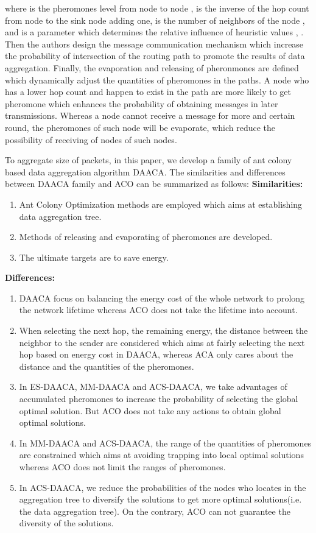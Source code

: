 \documentclass{elsarticle}
\begin{document}
where  is the pheromones level from node  to node ,  is the inverse of the hop count from node  to the sink node adding one,  is the number of neighbors of the node , and  is a parameter which determines the relative influence of heuristic values , .
Then the authors design the message communication mechanism which increase the probability of intersection of the routing path to promote the results of data aggregation.
Finally, the evaporation and releasing of pheronmones are defined which dynamically adjust the quantities of pheromones in the paths. A node who has a lower hop count and happen to exist in the path are more likely to get pheromone which enhances the probability of obtaining messages in later transmissions. Whereas a node cannot receive a message for more and certain round, the pheromones of such node will be evaporate, which reduce the possibility of receiving of nodes of such nodes.

To aggregate size of packets, in this paper, we develop a family of ant colony based data aggregation algorithm DAACA. The similarities and differences between DAACA family and ACO can be summarized as follows:
\textbf{Similarities:}
\begin{enumerate}
\item Ant Colony Optimization methods are employed which aims at establishing data aggregation tree.
\item Methods of releasing and evaporating of pheromones are developed.
\item The ultimate targets are to save energy.
\end{enumerate}
\textbf{Differences:}
\begin{enumerate}
\item DAACA focus on balancing the energy cost of the whole network to prolong the network lifetime whereas ACO does not take the lifetime into account.
\item When selecting the next hop, the remaining energy, the distance between the neighbor to the sender are considered which aims at fairly selecting the next hop based on energy cost in DAACA, whereas ACA only cares about the distance and the quantities of the pheromones.
\item In ES-DAACA, MM-DAACA and ACS-DAACA, we take advantages of accumulated pheromones to increase the probability of selecting the global optimal solution. But ACO does not take any actions to obtain global optimal solutions.
\item In MM-DAACA and ACS-DAACA, the range of the quantities of pheromones are constrained which aims at avoiding trapping into local optimal solutions whereas ACO does not limit the ranges of pheromones.
\item In ACS-DAACA, we reduce the probabilities of the nodes who locates in the aggregation tree to diversify the solutions to get more optimal solutions(i.e. the data aggregation tree). On the contrary, ACO can not guarantee the diversity of the solutions.
\end{enumerate}
\end{document}
